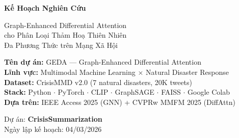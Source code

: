 \documentclass[12pt,a4paper]{article}
\begin{document}
\begin{titlepage}
\begin{center}
\vspace*{1cm}


\vspace{1.5cm}
{\Huge\bfseries\color{primary} Kế Hoạch Nghiên Cứu}

\vspace{0.6cm}
{\Large\color{secondary} Graph-Enhanced Differential Attention\\cho Phân Loại Thảm Hoạ Thiên Nhiên\\Đa Phương Thức trên Mạng Xã Hội}

\vspace{1cm}

\vspace{1cm}
{\large\color{primary}\textbf{Tên dự án:} GEDA — Graph-Enhanced Differential Attention}\\[0.4cm]
{\normalsize
\textbf{Lĩnh vực:} Multimodal Machine Learning $\times$ Natural Disaster Response\\[0.2cm]
\textbf{Dataset:} CrisisMMD v2.0 (7 natural disasters, 20K tweets)\\[0.2cm]
\textbf{Stack:} Python $\cdot$ PyTorch $\cdot$ CLIP $\cdot$ GraphSAGE $\cdot$ FAISS $\cdot$ Google Colab\\[0.2cm]
\textbf{Dựa trên:} IEEE Access 2025 (GNN) + CVPRw MMFM 2025 (DiffAttn)
}

\vspace{1.2cm}
{\large Dự án: \textbf{CrisisSummarization}}\\[0.3cm]
{\normalsize Ngày lập kế hoạch: 04/03/2026}

\vfill
{}
\end{center}
\end{titlepage}

\tableofcontents
\newpage

\end{document}

